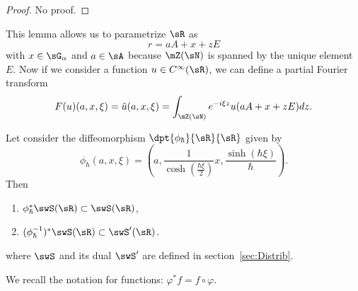 \begin{proof}
	No proof.
\end{proof}

This lemma allows us to parametrize $\sR$ as
\[
	r=aA+x+zE
\]
with $x\in\sG_{\alpha}$ and $a\in \sA$ because $\mZ(\sN)$ is spanned by the unique element $E$. Now if we consider a function $u\in C^{\infty}(\sR)$, we can define a partial Fourier transform
\[
	F(u)(a,x,\xi)=\hat u(a,x,\xi)=\int_{\mZ(\sN)}e^{-i\xi z}u(aA+x+zE)dz.
\]

\begin{theorem}
	Let consider the diffeomorphism $\dpt{\phi_{\hbar}}{\sR}{\sR}$ given by
	\[
		\phi_{\hbar}(a,x,\xi)=\left( a,\frac{1}{\cosh(\frac{\hbar\xi}{2})}x,\frac{\sinh(\hbar\xi)}{\hbar} \right).
	\]
	Then

	\begin{enumerate}
		\item $\phi_{\hbar}^*\swS(\sR)\subset\swS(\sR)$,
		\item $(\phi^{-1}_{\hbar})^*\swS(\sR)\subset\swS'(\sR)$.
	\end{enumerate}
	where $\swS$ and its dual $\swS'$ are defined in section~\ref{sec:Distrib}.

\end{theorem}

We recall the notation for functions: $\varphi^*f=f\circ\varphi$.


